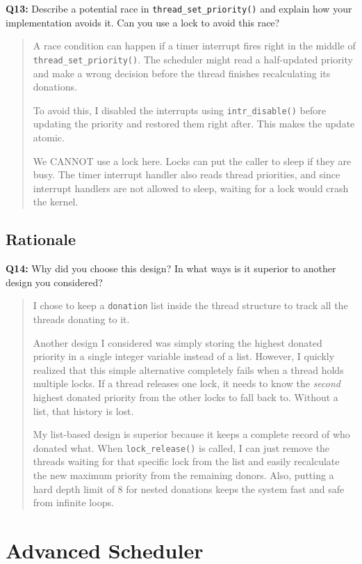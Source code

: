 \documentclass[a4paper,11pt]{paper}
\begin{document}
\textbf{Q13:} Describe a potential race in \texttt{thread\_set\_priority()} and
explain how your implementation avoids it. Can you use a lock to avoid this
race?

\begin{quote}
A race condition can happen if a timer interrupt fires right in the middle of \texttt{thread\_set\_priority()}. The scheduler might read a half-updated priority and make a wrong decision before the thread finishes recalculating its donations.

To avoid this, I disabled the interrupts using \texttt{intr\_disable()} before updating the priority and restored them right after. This makes the update atomic.

We CANNOT use a lock here. Locks can put the caller to sleep if they are busy. The timer interrupt handler also reads thread priorities, and since interrupt handlers are not allowed to sleep, waiting for a lock would crash the kernel.
\end{quote}

\subsection{Rationale}

\textbf{Q14:} Why did you choose this design?  In what ways is it superior to
another design you considered?

\begin{quote}
I chose to keep a \texttt{donation} list inside the thread structure to track all the threads donating to it. 

Another design I considered was simply storing the highest donated priority in a single integer variable instead of a list. However, I quickly realized that this simple alternative completely fails when a thread holds multiple locks. If a thread releases one lock, it needs to know the \textit{second} highest donated priority from the other locks to fall back to. Without a list, that history is lost.

My list-based design is superior because it keeps a complete record of who donated what. When \texttt{lock\_release()} is called, I can just remove the threads waiting for that specific lock from the list and easily recalculate the new maximum priority from the remaining donors. Also, putting a hard depth limit of 8 for nested donations keeps the system fast and safe from infinite loops.
\end{quote}

\section{Advanced Scheduler}
\end{document}
